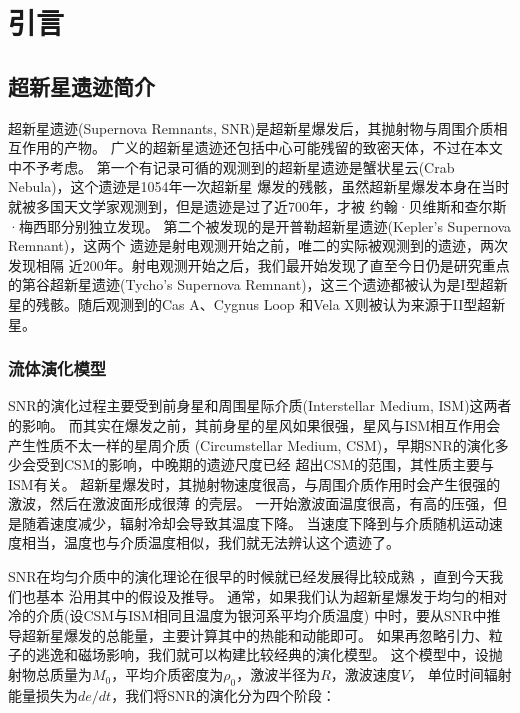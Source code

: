 \chapter{引言}
\label{Intro}

\section{超新星遗迹简介}
\label{SNRintro}
超新星遗迹(Supernova Remnants, SNR)是超新星爆发后，其抛射物与周围介质相互作用的产物。
广义的超新星遗迹还包括中心可能残留的致密天体，不过在本文中不予考虑。
第一个有记录可循的观测到的超新星遗迹是蟹状星云(Crab Nebula)，这个遗迹是1054年一次超新星
爆发的残骸，虽然超新星爆发本身在当时就被多国天文学家观测到，但是遗迹是过了近700年，才被
约翰·贝维斯和查尔斯·梅西耶分别独立发现\citep{barrow2011cosmic}。
第二个被发现的是开普勒超新星遗迹(Kepler's Supernova Remnant)\citep{Baade1943}，这两个
遗迹是射电观测开始之前，唯二的实际被观测到的遗迹\citep{Minkowski1964}，两次发现相隔
近200年。射电观测开始之后，我们最开始发现了直至今日仍是研究重点的第谷超新星遗迹(Tycho's
Supernova Remnant)，这三个遗迹都被认为是I型超新星的残骸。随后观测到的Cas A、Cygnus Loop
和Vela X则被认为来源于II型超新星。

\subsection{流体演化模型}

SNR的演化过程主要受到前身星和周围星际介质(Interstellar Medium, ISM)这两者的影响。
而其实在爆发之前，其前身星的星风如果很强，星风与ISM相互作用会产生性质不太一样的星周介质
(Circumstellar Medium, CSM)，早期SNR的演化多少会受到CSM的影响，中晚期的遗迹尺度已经
超出CSM的范围，其性质主要与ISM有关。
超新星爆发时，其抛射物速度很高，与周围介质作用时会产生很强的激波，然后在激波面形成很薄
的壳层。
一开始激波面温度很高，有高的压强，但是随着速度减少，辐射冷却会导致其温度下降。
当速度下降到与介质随机运动速度相当，温度也与介质温度相似，我们就无法辨认这个遗迹了。

SNR在均匀介质中的演化理论在很早的时候就已经发展得比较成熟
\citep{1959sdmm.book.....S, 1970IAUS...39..229W, Woltjer1972}，直到今天我们也基本
沿用其中的假设及推导。
通常，如果我们认为超新星爆发于均匀的相对冷的介质(设CSM与ISM相同且温度为银河系平均介质温度)
中时，要从SNR中推导超新星爆发的总能量，主要计算其中的热能和动能即可。
如果再忽略引力、粒子的逃逸和磁场影响，我们就可以构建比较经典的演化模型。
这个模型中，设抛射物总质量为$M_0$，平均介质密度为$\rho_0$，激波半径为$R$，激波速度$V$，
单位时间辐射能量损失为$de/dt$，我们将SNR的演化分为四个阶段：

